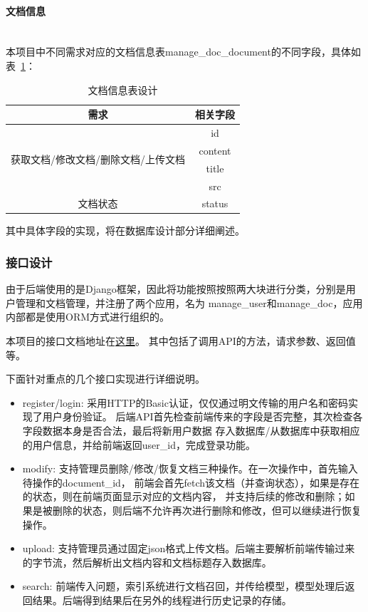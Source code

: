\documentclass[12pt]{article}
\newcommand{\myparagraph}[1]{\paragraph{#1}\mbox{}\\}
\begin{document}
\myparagraph{文档信息}
\indent 本项目中不同需求对应的文档信息表manage\_doc\_document的不同字段，具体如表~\ref{tab:manage-doc-document}：
\begin{table}[h]
\centering
\caption{文档信息表设计}
\label{tab:manage-doc-document}  %
\begin{tabular}{|c|c|}
\hline
需求                                   & 相关字段    \\ \hline
\multirow{4}{*}{获取文档/修改文档/删除文档/上传文档} & id      \\ \cline{2-2} 
                                     & content \\ \cline{2-2} 
                                     & title   \\ \cline{2-2} 
                                     & src     \\ \hline
文档状态                                 & status  \\ \hline
\end{tabular}
\end{table}

其中具体字段的实现，将在数据库设计部分详细阐述。

\subsubsection{接口设计}
由于后端使用的是Django框架，因此将功能按照按照两大块进行分类，分别是用户管理和文档管理，并注册了两个应用，名为
manage\_user和manage\_doc，应用内部都是使用ORM方式进行组织的。

本项目的接口文档地址在\href{https://easydoc.xyz/doc/71410797/1dBoJWEJ/skvUSixD}{这里}。
其中包括了调用API的方法，请求参数、返回值等。

下面针对重点的几个接口实现进行详细说明。

\begin{itemize}
    \item {
register/login: 采用HTTP的Basic认证，仅仅通过明文传输的用户名和密码实现了用户身份验证。
后端API首先检查前端传来的字段是否完整，其次检查各字段数据本身是否合法，最后将新用户数据
存入数据库/从数据库中获取相应的用户信息，并给前端返回user\_id，完成登录功能。
    }
    \item {
modify: 支持管理员删除/修改/恢复文档三种操作。在一次操作中，首先输入待操作的document\_id，
前端会首先fetch该文档（并查询状态），如果是存在的状态，则在前端页面显示对应的文档内容，
并支持后续的修改和删除；如果是被删除的状态，则后端不允许再次进行删除和修改，但可以继续进行恢复操作。
    }
    \item {
upload: 支持管理员通过固定json格式上传文档。后端主要解析前端传输过来的字节流，然后解析出文档内容和文档标题存入数据库。
    }
    \item {
search: 前端传入问题，索引系统进行文档召回，并传给模型，模型处理后返回结果。后端得到结果后在另外的线程进行历史记录的存储。
    }
\end{itemize}
\end{document}
